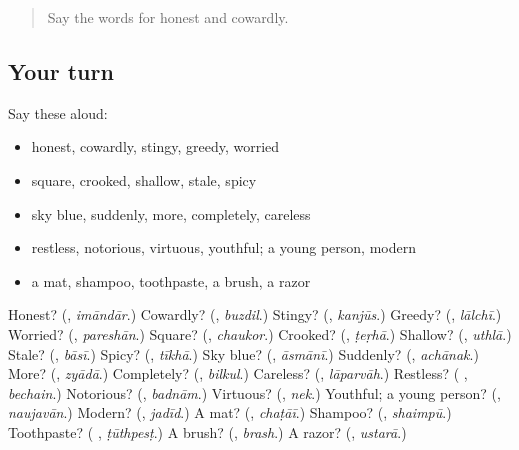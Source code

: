 \begin{quote}
Say the words for honest and cowardly.
\end{quote}

\subsection*{Your turn}
Say these aloud:

\begin{itemize}
\raggedright
  \item honest, cowardly, stingy, greedy, worried
  \item square, crooked, shallow, stale, spicy
  \item sky blue, suddenly, more, completely, careless
  \item restless, notorious, virtuous, youthful; a young person, modern
  \item a mat, shampoo, toothpaste, a brush, a razor
\end{itemize}

\begin{tcolorbox}[breakable,colback=teal!4,colframe=teal!35!black,title={Before you move on}]
Honest? (\textbf{}, \emph{imāndār}.) Cowardly? (\textbf{}, \emph{buzdil}.) Stingy? (\textbf{}, \emph{kanjūs}.) Greedy? (\textbf{}, \emph{lālchī}.) Worried? (\textbf{}, \emph{pareshān}.) Square? (\textbf{}, \emph{chaukor}.) Crooked? (\textbf{}, \emph{ṭeṛhā}.) Shallow? (\textbf{}, \emph{uthlā}.) Stale? (\textbf{}, \emph{bāsī}.) Spicy? (\textbf{}, \emph{tīkhā}.) Sky blue? (\textbf{}, \emph{āsmānī}.) Suddenly? (\textbf{}, \emph{achānak}.) More? (\textbf{}, \emph{zyādā}.) Completely? (\textbf{}, \emph{bilkul}.) Careless? (\textbf{}, \emph{lāparvāh}.) Restless? (\textbf{ }, \emph{bechain}.) Notorious? (\textbf{}, \emph{badnām}.) Virtuous? (\textbf{}, \emph{nek}.) Youthful; a young person? (\textbf{}, \emph{naujavān}.) Modern? (\textbf{}, \emph{jadīd}.) A mat? (\textbf{}, \emph{chaṭāī}.) Shampoo? (\textbf{}, \emph{shaimpū}.) Toothpaste? (\textbf{ }, \emph{ṭūthpesṭ}.) A brush? (\textbf{}, \emph{brash}.) A razor? (\textbf{}, \emph{ustarā}.)
\end{tcolorbox}
